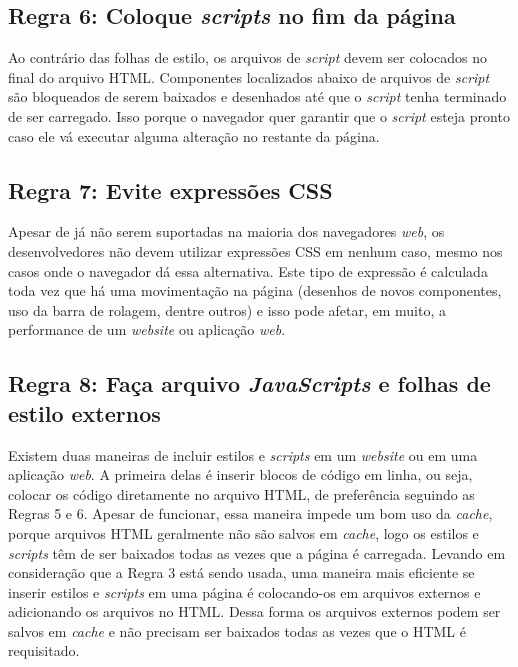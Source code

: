 \subsection{Regra 6: Coloque \textit{scripts} no fim da página}
\label{subsec:highperformance_regra6}
Ao contrário das folhas de estilo, os arquivos de \textit{script} devem ser colocados no final do arquivo HTML. Componentes localizados abaixo de arquivos de \textit{script} são bloqueados de serem baixados e desenhados até que o \textit{script} tenha terminado de ser carregado. Isso porque o navegador quer garantir que o \textit{script} esteja pronto caso ele vá executar alguma alteração no restante da página.

\subsection{Regra 7: Evite expressões CSS}
\label{subsec:highperformance_regra7}
Apesar de já não serem suportadas na maioria dos navegadores \textit{web}, os desenvolvedores não devem utilizar expressões CSS em nenhum caso, mesmo nos casos onde o navegador dá essa alternativa. Este tipo de expressão é calculada toda vez que há uma movimentação na página (desenhos de novos componentes, uso da barra de rolagem, dentre outros) e isso pode afetar, em muito, a performance de um \textit{website} ou aplicação \textit{web}.

\subsection{Regra 8: Faça arquivo \textit{JavaScripts} e folhas de estilo externos}
\label{subsec:highperformance_regra8}
Existem duas maneiras de incluir estilos e \textit{scripts} em um \textit{website} ou em uma aplicação \textit{web}. A primeira delas é inserir blocos de código em linha, ou seja, colocar os código diretamente no arquivo HTML, de preferência seguindo as Regras 5 e 6. Apesar de funcionar, essa maneira impede um bom uso da \textit{cache}, porque arquivos HTML geralmente não são salvos em \textit{cache}, logo os estilos e \textit{scripts} têm de ser baixados todas as vezes que a página é carregada. Levando em consideração que a Regra 3 está sendo usada, uma maneira mais eficiente se inserir estilos e \textit{scripts} em uma página é colocando-os em arquivos externos e adicionando os arquivos no HTML. Dessa forma os arquivos externos podem ser salvos em \textit{cache} e não precisam ser baixados todas as vezes que o HTML é requisitado.


